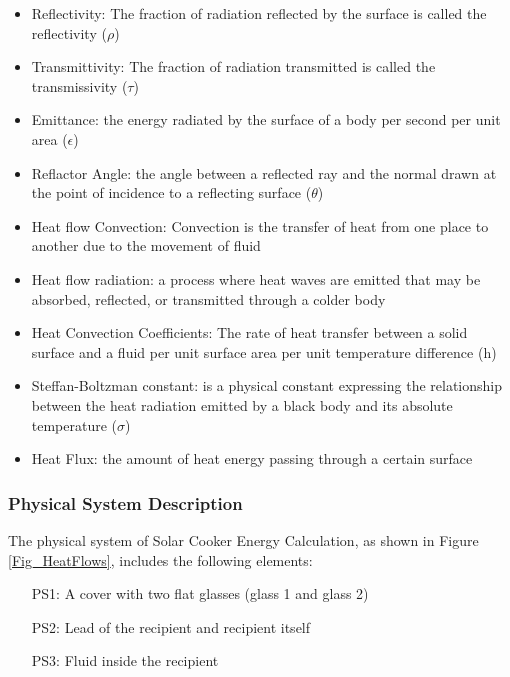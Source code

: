 \documentclass[12pt]{article}
\begin{document}
\begin{itemize}

\item Reflectivity: The fraction of radiation reflected by the surface is called the reflectivity ($\rho$) 
\item Transmittivity: The fraction of radiation transmitted is called the transmissivity ($\tau$)
\item Emittance: the energy radiated by the surface of a body per second per unit area ($\epsilon$)
\item Reflactor Angle: the angle between a reflected ray and the normal drawn at the point of incidence to a reflecting surface ($\theta$)
\item Heat flow Convection: Convection is the transfer of heat from one place to another due to the movement of fluid 
\item Heat flow radiation: a process where heat waves are emitted that may be absorbed, reflected, or transmitted through a colder body
\item Heat Convection Coefficients: The rate of heat transfer between a solid surface and a fluid per unit surface area per unit temperature difference (h) 
\item Steffan-Boltzman constant: is a physical constant expressing the relationship between the heat radiation emitted by a black body and its absolute temperature ($\sigma$)
\item Heat Flux: the amount of heat energy passing through a certain surface


\end{itemize}

\subsubsection{Physical System Description} \label{sec_phySystDescrip}

The physical system of Solar Cooker
Energy Calculation, as shown in Figure \ref{Fig_HeatFlows},
includes the following elements:


\begin{itemize}

\item[PS1:] A cover with two flat glasses (glass 1 and glass 2) 

\item[PS2:] Lead of the recipient and recipient itself

\item[PS3:] Fluid inside the recipient

\end{itemize}
\end{document}
